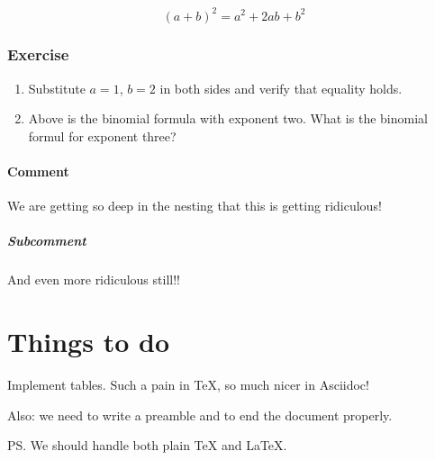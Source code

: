 \[
 (a + b)^2 = a^2 + 2ab + b^2
\]


\subsubsection{Exercise}

\begin{enumerate}

\item Substitute $a = 1$, $b = 2$ in both sides
and verify that equality holds.

\item Above is the binomial formula with exponent two.
What is the binomial formul for exponent three?

\end{enumerate}


\paragraph{Comment}

We are getting so deep in the nesting that this
is getting ridiculous!


\subparagraph{Subcomment}

And even more ridiculous still!!












\section{Things to do}

Implement tables.  Such a pain in TeX, so much nicer in Asciidoc!


Also: we need to write a preamble and to
end the document properly.


PS.  We should handle both plain TeX and LaTeX.




